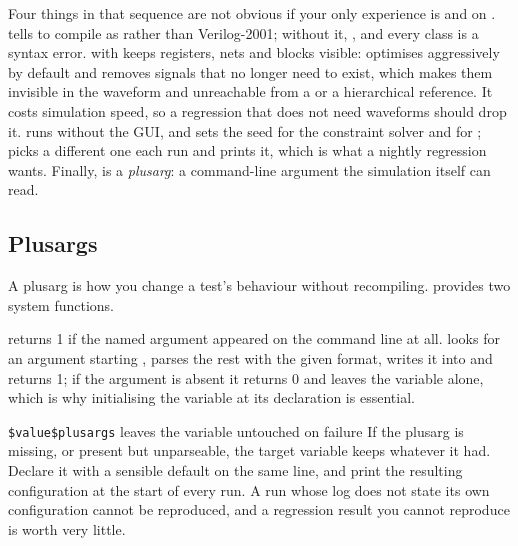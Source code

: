 Four things in that sequence are not obvious if your only 
experience is  and  on \VHDL{}.  tells
 to compile as \SV{}
rather than Verilog-2001; without it, ,  and every
class is a syntax error.  with  keeps registers, nets
and blocks visible:  optimises aggressively by default and
removes signals that no longer need to exist, which makes them invisible in the
waveform and unreachable from a  or a hierarchical reference. It
costs simulation speed, so a regression that does not need waveforms should
drop it.  runs without the GUI, and  sets the seed for
the constraint solver and for ;  picks a
different one each run and prints it, which is what a nightly regression wants.
Finally,  is a \emph{plusarg}: a command-line argument the
simulation itself can read.

\subsection{Plusargs}

A plusarg is how you change a test's
behaviour without recompiling. \SV{} provides two system functions.


 returns 1 if the named argument appeared on the command
line at all.  looks for an argument starting
, parses the rest with the given format, writes it into
 and returns 1; if the argument is absent it returns 0 and leaves
the variable alone, which is why initialising the variable at its declaration
is essential.

\begin{gotcha}{\texttt{\$value\$plusargs} leaves the variable untouched on failure}
If the plusarg is missing, or present but unparseable, the target variable
keeps whatever it had. Declare it with a sensible default on the same line, and
print the resulting configuration at the start of every run. A run whose log
does not state its own configuration cannot be reproduced, and a regression
result you cannot reproduce is worth very little.
\end{gotcha}

